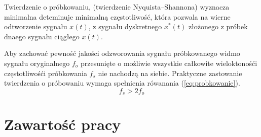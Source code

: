 Twierdzenie o próbkowaniu, (twierdzenie Nyquista–Shannona) wyznacza minimalna deteminuje minimalną częstotliwość, która pozwala na
wierne odtworzenie sygnału $x(t)$, z sygnału dyskretnego $x^*(t)$ złożonego z próbek dnaego sygnału ciągłego $x(t)$.

Aby zachować pewność jakości odzworowania sygnału próbkowanego widmo sygnału oryginalnego $f_o$ przesunięte o możliwie wszystkie całkowite wieloktonośći
częstotliwośći próbkowania $f_{s}$ nie nachodzą na siebie. Praktyczne zastowanie twierdzenia o próbowaniu wymaga spełnienia rówanania (\ref{eq:probkowanie}).
\begin{equation}
    f_s > 2f_o
    \label{eq:probkowanie}
\end{equation}



\section{Zawartość pracy}














